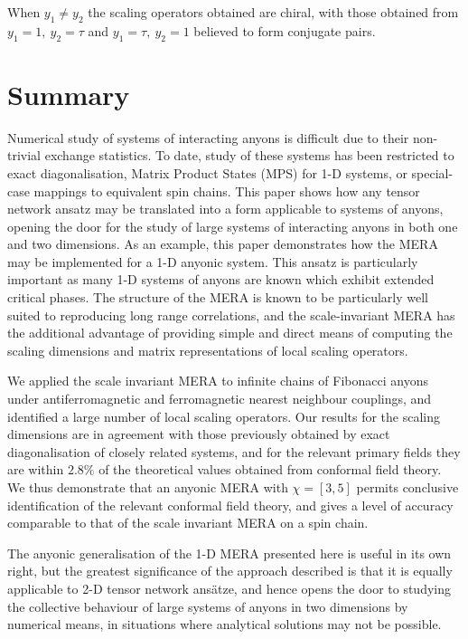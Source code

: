 \documentclass[aps,prb,reprint,superscriptaddress,amsfonts,amsmath,amssymb,showpacs,floatfix]{revtex4-1}
\newcommand{\prbtext}[1]{#1}
\newcommand{\pratext}[1]{}
\newcommand{\citestop}[1]{.\cite{#1}}
\begin{document}
When $y_1\not=y_2$ the scaling operators obtained are chiral, with those obtained from $y_1=1,~y_2=\tau$ and $y_1=\tau,~y_2=1$ believed to form conjugate pairs.

\section{Summary}

Numerical study of systems of interacting anyons is difficult due to their non-trivial exchange statistics. To date, study of these systems has been restricted to exact diagonalisation, Matrix Product States (MPS) for {1-D} systems, or special-case mappings to equivalent spin chains. This paper shows how any tensor network ansatz may be translated into a form applicable to systems of anyons, opening the door for the study of large systems of interacting anyons in both one and two dimensions. As an example, this paper demonstrates how the MERA may be implemented for a {1-D} anyonic system. This ansatz is particularly important as many
{1-D} systems of anyons are known which exhibit extended critical phases\pratext{ }\prbtext{.}\cite[see e.g.][]{feiguin2007,trebst2008,trebst2008a}\pratext{.} The structure of the MERA is known to be particularly well suited to reproducing long range correlations, and the scale-invariant MERA has the additional 
advantage of providing simple and direct means of computing the scaling dimensions and matrix representations of local scaling operators. %

We applied the scale invariant MERA to infinite chains of Fibonacci anyons under antiferromagnetic and ferromagnetic nearest neighbour couplings, and identified a large number of local scaling operators. Our results for the scaling dimensions are in agreement with those previously obtained by exact diagonalisation of closely related systems, and for the relevant primary fields they are within $2.8\%$ of the theoretical values obtained from conformal field theory. 
We thus demonstrate that an anyonic MERA with $\chi=[3,5]$ permits conclusive identification of the relevant conformal field theory, and gives a level of accuracy comparable to that of the scale invariant MERA on a spin chain\citestop{pfeifer2009}

The anyonic generalisation of the {1-D} MERA presented here is useful in its own right, but the greatest significance of the approach described is that it is equally applicable to 2-D tensor network ans\"atze, and hence opens the door to studying the collective behaviour of large systems of anyons in two dimensions by numerical means, in situations where analytical solutions may not be possible.
\end{document}
